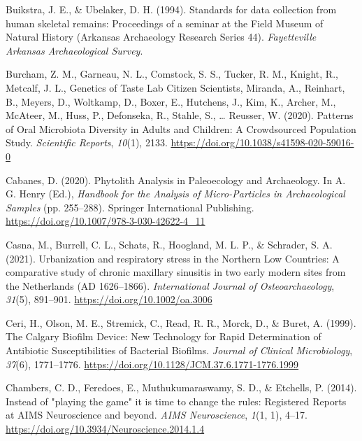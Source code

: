 \documentclass[
  letterpaper,
]{book}
\newlength{\cslhangindent}
\newlength{\cslentryspacingunit} %
\newenvironment{CSLReferences}[2] %
 {%
  \setlength{\parindent}{0pt}
  \ifodd #1
  \let\oldpar\par
  \def\par{\hangindent=\cslhangindent\oldpar}
  \fi
  \setlength{\parskip}{#2\cslentryspacingunit}
 }%
 {}
\begin{document}
\begin{CSLReferences}{1}{0}
\leavevmode{}%
Buikstra, J. E., \& Ubelaker, D. H. (1994). Standards for data
collection from human skeletal remains: {Proceedings} of a seminar at
the {Field Museum} of {Natural History} ({Arkansas Archaeology Research
Series} 44). \emph{Fayetteville Arkansas Archaeological Survey}.

\leavevmode{}%
Burcham, Z. M., Garneau, N. L., Comstock, S. S., Tucker, R. M., Knight,
R., Metcalf, J. L., Genetics of Taste Lab Citizen Scientists, Miranda,
A., Reinhart, B., Meyers, D., Woltkamp, D., Boxer, E., Hutchens, J.,
Kim, K., Archer, M., McAteer, M., Huss, P., Defonseka, R., Stahle, S.,
\ldots{} Reusser, W. (2020). Patterns of {Oral Microbiota Diversity} in
{Adults} and {Children}: {A Crowdsourced Population Study}.
\emph{Scientific Reports}, \emph{10}(1), 2133.
\url{https://doi.org/10.1038/s41598-020-59016-0}

\leavevmode{}%
Cabanes, D. (2020). Phytolith {Analysis} in {Paleoecology} and
{Archaeology}. In A. G. Henry (Ed.), \emph{Handbook for the {Analysis}
of {Micro-Particles} in {Archaeological Samples}} (pp. 255--288).
{Springer International Publishing}.
\url{https://doi.org/10.1007/978-3-030-42622-4_11}

\leavevmode{}%
Casna, M., Burrell, C. L., Schats, R., Hoogland, M. L. P., \& Schrader,
S. A. (2021). Urbanization and respiratory stress in the {Northern Low
Countries}: {A} comparative study of chronic maxillary sinusitis in two
early modern sites from the {Netherlands} ({AD} 1626--1866).
\emph{International Journal of Osteoarchaeology}, \emph{31}(5),
891--901. \url{https://doi.org/10.1002/oa.3006}

\leavevmode{}%
Ceri, H., Olson, M. E., Stremick, C., Read, R. R., Morck, D., \& Buret,
A. (1999). The {Calgary Biofilm Device}: {New Technology} for {Rapid
Determination} of {Antibiotic Susceptibilities} of {Bacterial Biofilms}.
\emph{Journal of Clinical Microbiology}, \emph{37}(6), 1771--1776.
\url{https://doi.org/10.1128/JCM.37.6.1771-1776.1999}

\leavevmode{}%
Chambers, C. D., Feredoes, E., Muthukumaraswamy, S. D., \& Etchells, P.
(2014). Instead of "playing the game" it is time to change the rules:
{Registered Reports} at {AIMS Neuroscience} and beyond. \emph{AIMS
Neuroscience}, \emph{1}(1, 1), 4--17.
\url{https://doi.org/10.3934/Neuroscience.2014.1.4}


\end{CSLReferences}
\end{document}
